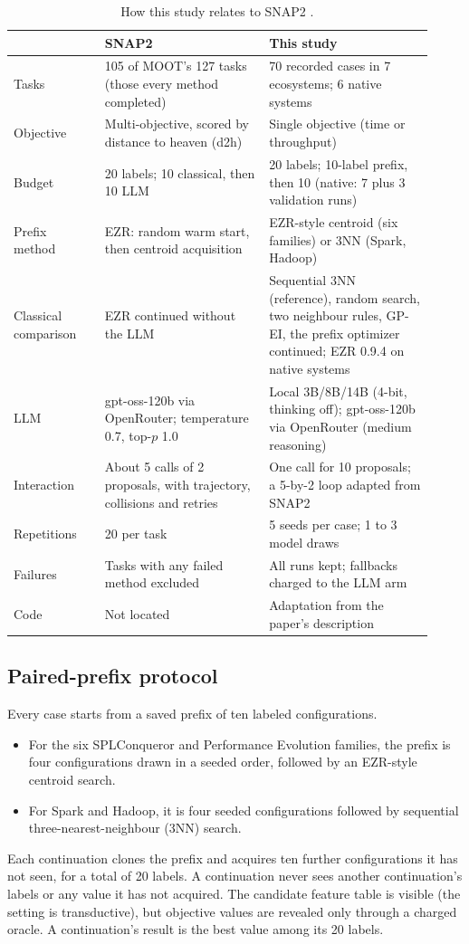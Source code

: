 \begin{table}[t]
\centering
\caption{How this study relates to SNAP2 \cite{srinivasan2026snap2}.}
\label{tab:snap2}
\small
\begin{tabular}{p{0.2\linewidth}p{0.36\linewidth}p{0.36\linewidth}}
\toprule
 & SNAP2 & This study \\
\midrule
Tasks & 105 of MOOT's 127 tasks (those every method completed) & 70 recorded cases in 7 ecosystems; 6 native systems \\
Objective & Multi-objective, scored by distance to heaven (d2h) & Single objective (time or throughput) \\
Budget & 20 labels; 10 classical, then 10 LLM & 20 labels; 10-label prefix, then 10 (native: 7 plus 3 validation runs) \\
Prefix method & EZR: random warm start, then centroid acquisition & EZR-style centroid (six families) or 3NN (Spark, Hadoop) \\
Classical comparison & EZR continued without the LLM & Sequential 3NN (reference), random search, two neighbour rules, GP-EI, the prefix optimizer continued; EZR 0.9.4 on native systems \\
LLM & gpt-oss-120b via OpenRouter; temperature 0.7, top-$p$ 1.0 & Local 3B/8B/14B (4-bit, thinking off); gpt-oss-120b via OpenRouter (medium reasoning) \\
Interaction & About 5 calls of 2 proposals, with trajectory, collisions and retries & One call for 10 proposals; a 5-by-2 loop adapted from SNAP2 \\
Repetitions & 20 per task & 5 seeds per case; 1 to 3 model draws \\
Failures & Tasks with any failed method excluded & All runs kept; fallbacks charged to the LLM arm \\
Code & Not located & Adaptation from the paper's description \\
\bottomrule
\end{tabular}
\end{table}

\subsection{Paired-prefix protocol}

Every case starts from a saved prefix of ten labeled configurations.
\begin{itemize}
  \item For the six SPLConqueror and Performance Evolution families, the prefix is four configurations drawn in a seeded order, followed by an EZR-style centroid search.
  \item For Spark and Hadoop, it is four seeded configurations followed by sequential three-nearest-neighbour (3NN) search.
\end{itemize}
Each continuation clones the prefix and acquires ten further configurations it has not seen, for a total of 20 labels. A continuation never sees another continuation's labels or any value it has not acquired. The candidate feature table is visible (the setting is transductive), but objective values are revealed only through a charged oracle. A continuation's result is the best value among its 20 labels.

